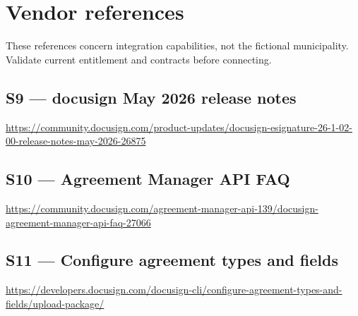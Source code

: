 \documentclass[11pt,letterpaper]{article}
\begin{document}
\newpage\section{Vendor references}
These references concern integration capabilities, not the fictional municipality. Validate current entitlement and contracts before connecting.
\subsection*{S9 --- docusign May 2026 release notes}\label{src:S9}
\url{https://community.docusign.com/product-updates/docusign-esignature-26-1-02-00-release-notes-may-2026-26875}
\subsection*{S10 --- Agreement Manager API FAQ}\label{src:S10}
\url{https://community.docusign.com/agreement-manager-api-139/docusign-agreement-manager-api-faq-27066}
\subsection*{S11 --- Configure agreement types and fields}\label{src:S11}
\url{https://developers.docusign.com/docusign-cli/configure-agreement-types-and-fields/upload-package/}
\end{document}
